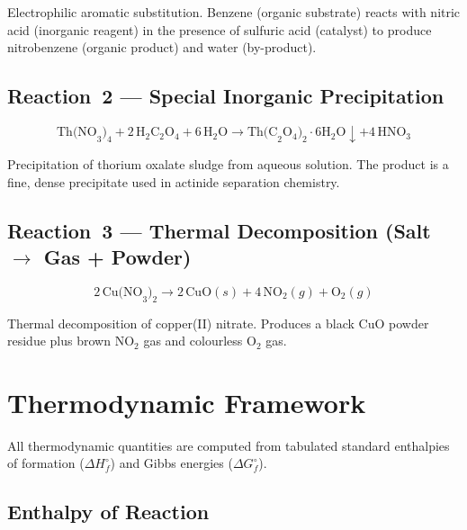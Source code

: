 \documentclass[11pt,a4paper]{article}
\begin{document}
Electrophilic aromatic substitution.  Benzene (organic substrate) reacts
with nitric acid (inorganic reagent) in the presence of sulfuric acid
(catalyst) to produce nitrobenzene (organic product) and water (by-product).

\subsection{Reaction~2 --- Special Inorganic Precipitation}

\begin{equation}
    \text{Th(NO}_3\text{)}_4 + 2\,\text{H}_2\text{C}_2\text{O}_4
    + 6\,\text{H}_2\text{O}
    \longrightarrow
    \text{Th(C}_2\text{O}_4\text{)}_2 \cdot 6\text{H}_2\text{O}\!\downarrow
    + 4\,\text{HNO}_3
    \label{eq:thorium}
\end{equation}

Precipitation of thorium oxalate sludge from aqueous solution.  The product
is a fine, dense precipitate used in actinide separation chemistry.

\subsection{Reaction~3 --- Thermal Decomposition (Salt \texorpdfstring{$\to$}{to} Gas + Powder)}

\begin{equation}
    2\,\text{Cu(NO}_3\text{)}_2
    \longrightarrow
    2\,\text{CuO}(s) + 4\,\text{NO}_2(g) + \text{O}_2(g)
    \label{eq:copper}
\end{equation}

Thermal decomposition of copper(II) nitrate.  Produces a black CuO powder
residue plus brown NO$_2$ gas and colourless O$_2$ gas.

\section{Thermodynamic Framework}
\label{sec:thermo}

All thermodynamic quantities are computed from tabulated standard enthalpies
of formation ($\Delta H_f^\circ$) and Gibbs energies ($\Delta G_f^\circ$).

\subsection{Enthalpy of Reaction}
\end{document}
